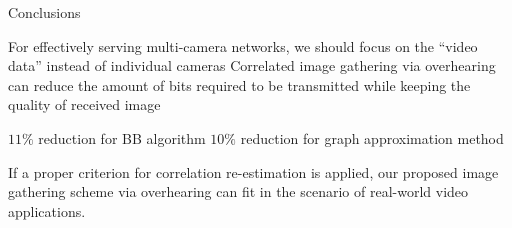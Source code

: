 \begin{frame}{Conclusions}
\begin{itemize}
	\myItem For effectively serving multi-camera networks, we should focus on the ``video data'' instead of individual cameras
	\myItem Correlated image gathering via overhearing can reduce the amount of bits required to be transmitted while keeping the quality of received image
	\begin{itemize}
		\mySubItem $11 \%$ reduction for BB algorithm
		\mySubItem $10 \%$ reduction for graph approximation method
	\end{itemize}
	\myItem If a proper criterion for correlation re-estimation is applied, our proposed image gathering scheme via overhearing can fit in the scenario of real-world video applications.
\end{itemize}
\end{frame}